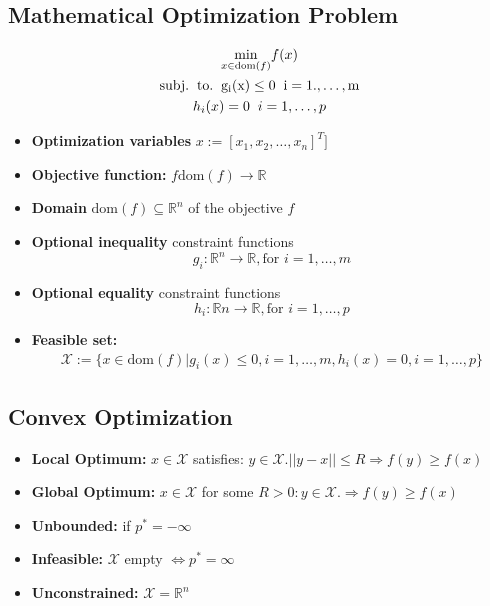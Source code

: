 \subsection{Mathematical Optimization Problem}
\begin{gather*}
 \underset{x\in \mathrm{dom}(f)}{\mathrm{min}} f(x)\\
 \mathrm{subj. \hspace{2mm} to. \hspace{2mm} g_i(x) \leq 0 \hspace{2mm} i = 1.,\dots,m}\\
 h_i(x) = 0 \hspace{2mm} i = 1,\dots , p
\end{gather*}
\begin{itemize}
    \item \textbf{Optimization variables} $x:= [x_1, x_2,\dots, x_n]^T]$
    \item \textbf{Objective function:} $f \mathrm{dom}(f) \rightarrow \mathbb{R}$
    \item \textbf{Domain} $\mathrm{dom}(f) \subseteq \mathbb{R}^n$ of the objective $f$
    \item \textbf{Optional inequality} constraint functions \[g_i : \mathbb{R}^n \rightarrow \mathbb{R}, \textrm{for } i =1,\dots,m\]
    \item \textbf{Optional equality} constraint functions \[h_i: \mathbb{R}n \rightarrow \mathbb{R}, \textrm{for } i = 1,\dots, p\]
    \item  \textbf{Feasible set:}\begin{gather*}\mathcal{X} := \{x\in \textrm{dom}(f) | g_i(x) \leq 0,i=1,\dots,m, h_i(x)=0, i =1,\dots,p \} \end{gather*}
   
\end{itemize}
\subsection{Convex Optimization}
\begin{itemize}
    \item \textbf{Local Optimum:} $x \in \mathcal{X}$ satisfies: $y \in \mathcal{X}. ||y-x|| \leq R \Rightarrow f(y) \geq f(x)$
    \item \textbf{Global Optimum:} $x \in \mathcal{X}$ for some $R > 0: y \in \mathcal{X}. \Rightarrow f(y) \geq f(x)$ 
    \item \textbf{Unbounded:} if $p^* = -\infty$
    \item \textbf{Infeasible:} $\mathcal{X}$ empty $\Leftrightarrow p^* = \infty$
    \item \textbf{Unconstrained:} $\mathcal{X} = \mathbb{R}^n$
\end{itemize}

